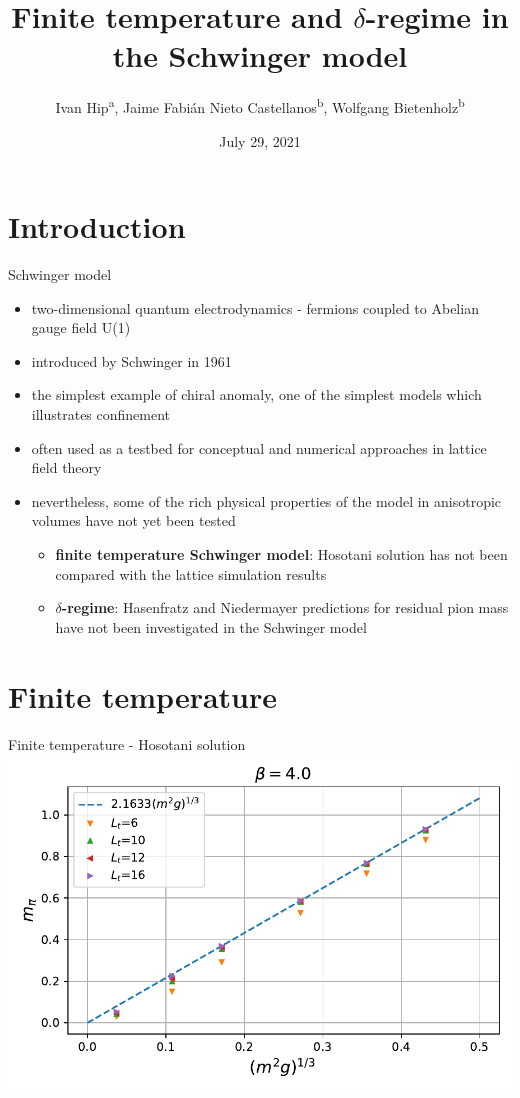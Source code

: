 \documentclass[english]{beamer}
\title{Finite temperature and $\delta$-regime in the Schwinger model}
\author{
  Ivan Hip\textsuperscript{a},
  Jaime Fabián Nieto Castellanos\textsuperscript{b},
  Wolfgang Bietenholz\textsuperscript{b}}
\institute{
  \textsuperscript{a}University of Zagreb, Croatia\\
  \textsuperscript{b}UNAM, Mexico
}
\date{July 29, 2021}
\begin{document}
 
\begin{frame}
  \titlepage
\end{frame}

\section{Introduction}

\begin{frame}{Schwinger model}
  \begin{itemize}
    \item two-dimensional quantum electrodynamics - fermions coupled to Abelian gauge field U(1)
    \item introduced by Schwinger in 1961
    \item the simplest example of chiral anomaly, one of the simplest models which illustrates confinement
    \item often used as a testbed for conceptual and numerical
approaches in lattice field theory
    \item nevertheless, some of the rich physical
properties of the model in anisotropic volumes have not yet been tested
    \begin{itemize}
      \item \textbf{finite temperature Schwinger model}: Hosotani solution has not been compared with the lattice simulation results
      \item \textbf{$\delta$-regime}: Hasenfratz and Niedermayer predictions for residual pion mass have not been investigated in the Schwinger model
    \end{itemize}
  \end{itemize}
\end{frame}

\section{Finite temperature}

\begin{frame}{Finite temperature - Hosotani solution}
  \includegraphics[width=1\textwidth]{figs/FiniteTMPiHos}
\end{frame}
\end{document}
